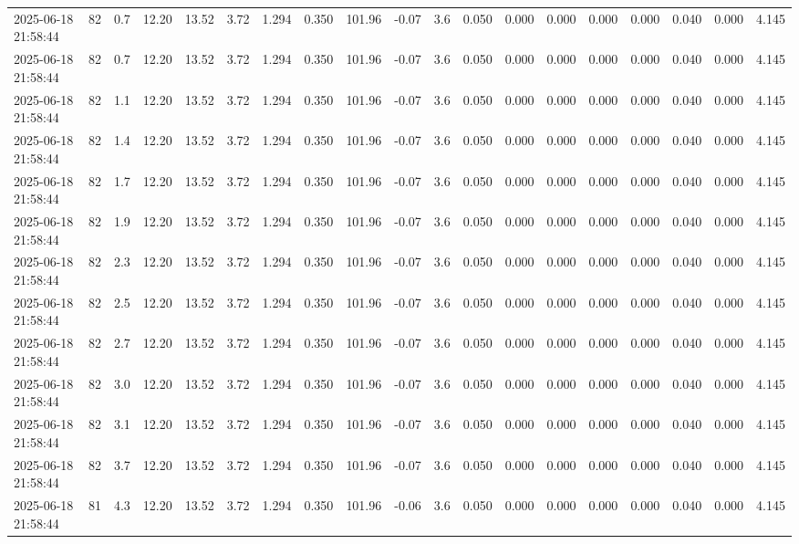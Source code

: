 \documentclass[UTF8,10pt,a4paper,fontset=fandol]{ctexart}
\begin{document}
\begin{center}
{{\begin{tabular}{|l|r|r|r|r|r|r|r|r|r|r|r|r|r|r|r|r|r|}
2025-06-18 21:58:44 & 82 & 0.7 & 12.20 & 13.52 & 3.72 & 1.294 & 0.350 & 101.96 & -0.07 & 3.6 & 0.050 & 0.000 & 0.000 & 0.000 & 0.000 & 0.040 & 0.000 & 4.145 \\
2025-06-18 21:58:44 & 82 & 0.7 & 12.20 & 13.52 & 3.72 & 1.294 & 0.350 & 101.96 & -0.07 & 3.6 & 0.050 & 0.000 & 0.000 & 0.000 & 0.000 & 0.040 & 0.000 & 4.145 \\
2025-06-18 21:58:44 & 82 & 1.1 & 12.20 & 13.52 & 3.72 & 1.294 & 0.350 & 101.96 & -0.07 & 3.6 & 0.050 & 0.000 & 0.000 & 0.000 & 0.000 & 0.040 & 0.000 & 4.145 \\
2025-06-18 21:58:44 & 82 & 1.4 & 12.20 & 13.52 & 3.72 & 1.294 & 0.350 & 101.96 & -0.07 & 3.6 & 0.050 & 0.000 & 0.000 & 0.000 & 0.000 & 0.040 & 0.000 & 4.145 \\
2025-06-18 21:58:44 & 82 & 1.7 & 12.20 & 13.52 & 3.72 & 1.294 & 0.350 & 101.96 & -0.07 & 3.6 & 0.050 & 0.000 & 0.000 & 0.000 & 0.000 & 0.040 & 0.000 & 4.145 \\
2025-06-18 21:58:44 & 82 & 1.9 & 12.20 & 13.52 & 3.72 & 1.294 & 0.350 & 101.96 & -0.07 & 3.6 & 0.050 & 0.000 & 0.000 & 0.000 & 0.000 & 0.040 & 0.000 & 4.145 \\
2025-06-18 21:58:44 & 82 & 2.3 & 12.20 & 13.52 & 3.72 & 1.294 & 0.350 & 101.96 & -0.07 & 3.6 & 0.050 & 0.000 & 0.000 & 0.000 & 0.000 & 0.040 & 0.000 & 4.145 \\
2025-06-18 21:58:44 & 82 & 2.5 & 12.20 & 13.52 & 3.72 & 1.294 & 0.350 & 101.96 & -0.07 & 3.6 & 0.050 & 0.000 & 0.000 & 0.000 & 0.000 & 0.040 & 0.000 & 4.145 \\
2025-06-18 21:58:44 & 82 & 2.7 & 12.20 & 13.52 & 3.72 & 1.294 & 0.350 & 101.96 & -0.07 & 3.6 & 0.050 & 0.000 & 0.000 & 0.000 & 0.000 & 0.040 & 0.000 & 4.145 \\
2025-06-18 21:58:44 & 82 & 3.0 & 12.20 & 13.52 & 3.72 & 1.294 & 0.350 & 101.96 & -0.07 & 3.6 & 0.050 & 0.000 & 0.000 & 0.000 & 0.000 & 0.040 & 0.000 & 4.145 \\
2025-06-18 21:58:44 & 82 & 3.1 & 12.20 & 13.52 & 3.72 & 1.294 & 0.350 & 101.96 & -0.07 & 3.6 & 0.050 & 0.000 & 0.000 & 0.000 & 0.000 & 0.040 & 0.000 & 4.145 \\
2025-06-18 21:58:44 & 82 & 3.7 & 12.20 & 13.52 & 3.72 & 1.294 & 0.350 & 101.96 & -0.07 & 3.6 & 0.050 & 0.000 & 0.000 & 0.000 & 0.000 & 0.040 & 0.000 & 4.145 \\
2025-06-18 21:58:44 & 81 & 4.3 & 12.20 & 13.52 & 3.72 & 1.294 & 0.350 & 101.96 & -0.06 & 3.6 & 0.050 & 0.000 & 0.000 & 0.000 & 0.000 & 0.040 & 0.000 & 4.145 \\

\end{tabular}}}
\end{center}
\end{document}
